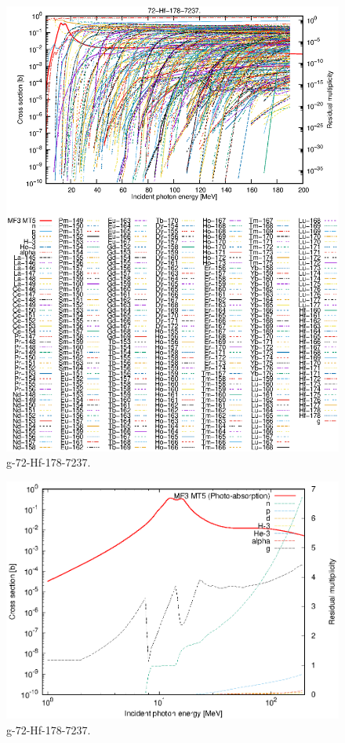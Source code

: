 \begin{figure}
 \includegraphics[width=\linewidth]{eps/g_72-Hf-178_7237.eps}
  \caption{g-72-Hf-178-7237.}
\end{figure}
\newpage \clearpage

\begin{figure}
 \includegraphics[width=\linewidth]{eps-log/g_72-Hf-178_7237.eps}
 \caption{g-72-Hf-178-7237.}
\end{figure}
\newpage \clearpage

